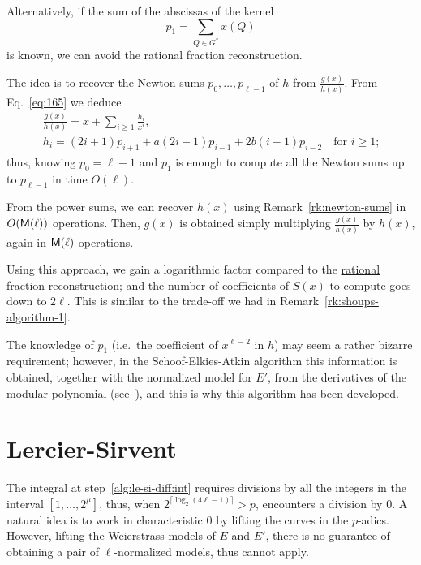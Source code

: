 \begin{remark}
  \label{rk:bmss}
  Alternatively, if the sum of the abscissas of the kernel
  \begin{equation}
    \label{eq:182}
    p_1 = \sum_{Q\in G^\ast}x(Q)
  \end{equation}
  is known, we can avoid the rational fraction reconstruction.

  The idea is to recover the Newton sums $p_0,\ldots,p_{\ell-1}$ of
  $h$ from $\frac{g(x)}{h(x)}$. From Eq.~\eqref{eq:165} we deduce
  \begin{equation}
    \label{eq:181}
    \begin{gathered}
      \frac{g(x)}{h(x)} = x + \sum_{i\ge1}\frac{h_i}{x^i}\text{,}\\
      h_i = (2i+1)p_{i+1} + a(2i-1)p_{i-1} + 2b(i-1)p_{i-2}
      \quad\text{for $i\ge1$;}
    \end{gathered}
  \end{equation}
  thus, knowing $p_0=\ell-1$ and $p_1$ is enough to compute all the
  Newton sums up to $p_{\ell-1}$ in time $O(\ell)$.

  From the power sums, we can recover $h(x)$ using
  Remark~\ref{rk:newton-sums} in $O(\mathsf{M}(\ell))$ operations. Then,
  $g(x)$ is obtained simply multiplying $\frac{g(x)}{h(x)}$ by $h(x)$,
  again in $\mathsf{M}(\ell)$ operations.

  Using this approach, we gain a logarithmic factor compared to the
  \hyperref[sec:eucl-algor-rati]{rational fraction reconstruction};
  and the number of coefficients of $S(x)$ to compute goes down to
  $2\ell$. This is similar to the trade-off we had in
  Remark~\ref{rk:shoups-algorithm-1}.

  The knowledge of $p_1$ (i.e.\ the coefficient of $x^{\ell-2}$ in
  $h$) may seem a rather bizarre requirement; however, in the
  Schoof-Elkies-Atkin algorithm this information is obtained, together
  with the normalized model for $E'$, from the derivatives of the
  modular polynomial (see~\cite{elkies98,morain95}), and this is why
  this algorithm has been developed.
\end{remark}



\section{Lercier-Sirvent}
\label{sec:lercier-sirvent}
The integral at step~\ref{alg:le-si-diff:int} requires divisions by
all the integers in the interval $[1,\ldots,2^\mu]$, thus, when
$2^{\lceil\log_2(4\ell-1)\rceil}>p$, \hyperref[alg:bmss]{}
encounters a division by $0$. A natural idea is to work in
characteristic $0$ by lifting the curves in the $p$-adics. However,
lifting the Weierstrass models of $E$ and $E'$, there is no guarantee
of obtaining a pair of $\ell$-normalized models, thus
\hyperref[alg:bmss]{} cannot apply.

